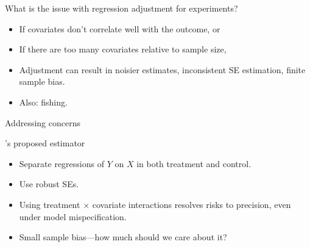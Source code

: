 \documentclass[xcolor={dvipsnames},handout]{beamer}
\begin{document}

\begin{frame}{What is the issue with regression adjustment for experiments?}

\begin{itemize}
\item If covariates don't correlate well with the outcome, or 
\item If there are too many covariates relative to sample size, 
\item Adjustment can result in noisier estimates, inconsistent SE estimation, finite sample bias. 
\item Also: fishing. 
\end{itemize}

\end{frame}



\begin{frame}{Addressing concerns}

\cite{lin2013agnostic}'s proposed estimator
\begin{itemize}
\item Separate regressions of $Y$ on $X$ in both treatment and control. 
\item Use robust SEs. 
\item Using treatment $\times$ covariate interactions resolves risks to precision, even under model mispecification. 
\item Small sample bias—how much should we care about it?
\end{itemize}

\end{frame}


\end{document}
